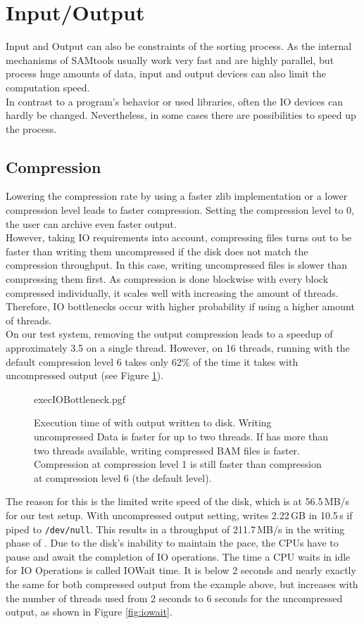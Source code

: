 \section{Input/Output} 
Input and Output can also be constraints of the sorting process. As the internal mechanisms of SAMtools usually work very fast and are highly parallel, but process huge amounts of data, input and output devices can also limit the computation speed. \\
In contrast to a program's behavior or used libraries, often the IO devices can hardly be changed. Nevertheless, in some cases there are possibilities to speed up the process.

\subsection{Compression}
Lowering the compression rate by using a faster zlib implementation or a lower compression level leads to faster compression. Setting the compression level to 0, the user can archive even faster output. \\
However, taking IO requirements into account, compressing files turns out to be faster than writing them uncompressed if the disk does not match the compression throughput. In this case, writing uncompressed files is slower than compressing them first. As compression is done blockwise with every block compressed individually, it scales well with increasing the amount of threads. Therefore, IO bottlenecks occur with higher probability if using a higher amount of threads. \\
On our test system, removing the output compression leads to a speedup of approximately 3.5 on a single thread. However, on 16 threads, running \sort with the default compression level 6 takes only 62\% of the time it takes with uncompressed output (see Figure \ref{fig:execIO}). \\
\begin{figure}[t]
        {execIOBottleneck.pgf}
    \caption{Execution time of \sort with output written to disk. Writing uncompressed Data is faster for up to two threads. If \sort has more than two threads available, writing compressed BAM files is faster. Compression at compression level 1 is still faster than compression at compression level 6 (the default level).}
    \label{fig:execIO}
\end{figure}
The reason for this is the limited write speed of the disk, which is at 56.5\,MB/s for our test setup. With uncompressed output setting, \sort writes 2.22\,GB in 10.5\,s if piped to \texttt{/dev/null}. This results in a throughput of 211.7\,MB/s in the writing phase of \sort. Due to the disk's inability to maintain the pace, the CPUs have to pause and await the completion of IO operations. The time a CPU waits in idle for IO Operations is called IOWait time. It is below 2 seconds and nearly exactly the same for both compressed output from the example above, but increases with the number of threads used from 2 seconds to 6 seconds for the uncompressed output, as shown in Figure \ref{fig:iowait}.
